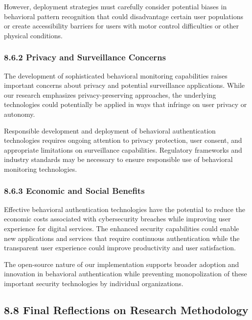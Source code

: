 \documentclass[
  11pt,
  a4paper,
]{article}
\begin{document}
However, deployment strategies must carefully consider potential biases
in behavioral pattern recognition that could disadvantage certain user
populations or create accessibility barriers for users with motor
control difficulties or other physical conditions.

\subsubsection{8.6.2 Privacy and Surveillance
Concerns}\label{privacy-and-surveillance-concerns}

The development of sophisticated behavioral monitoring capabilities
raises important concerns about privacy and potential surveillance
applications. While our research emphasizes privacy-preserving
approaches, the underlying technologies could potentially be applied in
ways that infringe on user privacy or autonomy.

Responsible development and deployment of behavioral authentication
technologies requires ongoing attention to privacy protection, user
consent, and appropriate limitations on surveillance capabilities.
Regulatory frameworks and industry standards may be necessary to ensure
responsible use of behavioral monitoring technologies.

\subsubsection{8.6.3 Economic and Social
Benefits}\label{economic-and-social-benefits}

Effective behavioral authentication technologies have the potential to
reduce the economic costs associated with cybersecurity breaches while
improving user experience for digital services. The enhanced security
capabilities could enable new applications and services that require
continuous authentication while the transparent user experience could
improve productivity and user satisfaction.

The open-source nature of our implementation supports broader adoption
and innovation in behavioral authentication while preventing
monopolization of these important security technologies by individual
organizations.

\subsection{8.8 Final Reflections on Research
Methodology}\label{final-reflections-on-research-methodology}
\end{document}
